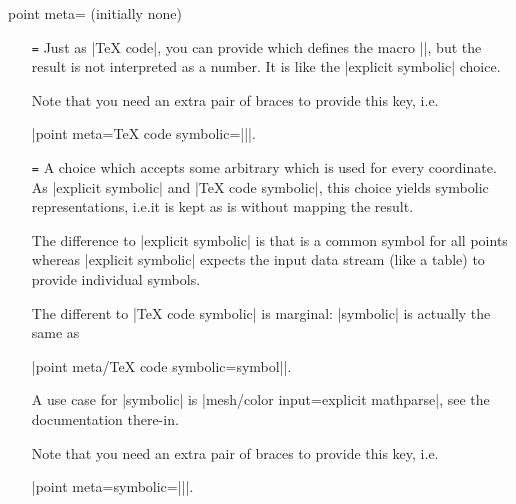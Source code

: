 \begin{pgfplotskey}{point meta= (initially none)%
}
\begin{itemize}
            Note that the math parser will be configured to use the |fpu| at
            this time, so |\pgfmathparse| yields floats.

            Note that you need an extra pair of braces to provide this key,
            i.e.\@

            |point meta={TeX code=||}|.

        \item[\normalfont\declaretext{TeX code
            symbolic}\texttt{=}\meta{code}] Just as |TeX code|, you can
            provide  which defines the macro |\pgfplotspointmeta|,
            but the result is not interpreted as a number. It is like the
            |explicit symbolic| choice.

            Note that you need an extra pair of braces to provide this key,
            i.e.\@

            |point meta={TeX code symbolic=||}|.
        \item[\normalfont\declaretext{symbolic}\texttt{=}\meta{symbol}] A
            choice which accepts some arbitrary  which is used
            for every coordinate. As |explicit symbolic| and
            |TeX code symbolic|, this choice yields symbolic representations,
            i.e.\@ it is kept as is without mapping the result.

            The difference to |explicit symbolic| is that  is a
            common symbol for all points whereas |explicit symbolic| expects
            the input data stream (like a table) to provide individual
            symbols.

            The different to |TeX code symbolic| is marginal: |symbolic| is
            actually the same as

            |point meta/TeX code symbolic={\def\pgfplotspointmeta|\marg{symbol}|}|.

            A use case for |symbolic| is
            |mesh/color input=explicit mathparse|, see the documentation
            there-in.

            Note that you need an extra pair of braces to provide this key,
            i.e.\@

            |point meta={symbolic=||}|.
    \end{itemize}


\end{pgfplotskey}
